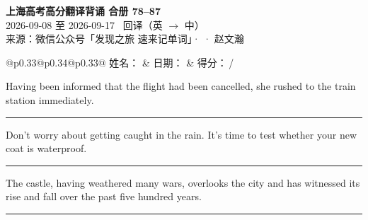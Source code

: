 \documentclass[11pt,a4paper]{article}
\newcommand{\num}[1]{\makebox[1.9em][r]{#1.}\hspace{0.3em}}
\newcommand{\wline}{\noindent\rule{\linewidth}{0.4pt}}
\begin{document}
\pagestyle{plain}
\begin{center}
{\LARGE\bfseries 上海高考高分翻译背诵 \quad 合册 78–87}\\[0.25em]
{\large 2026-09-08 至 2026-09-17 \quad\ 回译（英 $\to$ 中）}\\[0.35em]
{\footnotesize 来源：微信公众号「发现之旅 速来记单词」·  · 赵文瀚}
\end{center}

\vspace{0.4em}
\noindent\begin{tabular}{@{}p{0.33\textwidth}@{}p{0.34\textwidth}@{}p{0.33\textwidth}@{}}
姓名：\underline{\hspace{2.0cm}} & 日期：\underline{\hspace{2.0cm}} & 得分：\underline{\hspace{1.4cm}}\,/ \\
\end{tabular}

\vspace{0.5em}

\vspace{0.8em}
\vspace{0.35em}\vspace{0.15em}

\begin{minipage}{\linewidth}

\num{1}Having been informed that the flight had been cancelled, she rushed to the train station immediately.

\vspace{0.25em}

\wline

\end{minipage}

\begin{minipage}{\linewidth}

\num{2}Don’t worry about getting caught in the rain. It’s time to test whether your new coat is waterproof.

\vspace{0.25em}

\wline

\end{minipage}

\begin{minipage}{\linewidth}

\num{3}The castle, having weathered many wars, overlooks the city and has witnessed its rise and fall over the past five hundred years.

\vspace{0.25em}

\wline

\end{minipage}
\end{document}
